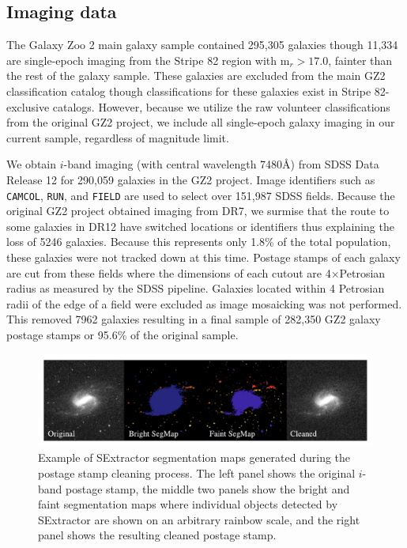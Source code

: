 \subsection{Imaging data}
The Galaxy Zoo 2 main galaxy sample contained 295,305 galaxies though 11,334 are single-epoch imaging from the Stripe 82 region with m$_r > 17.0$, fainter than the rest of the galaxy sample. These galaxies are excluded from the main GZ2 classification catalog though classifications for these galaxies exist in Stripe 82-exclusive catalogs. However, because we utilize the raw volunteer classifications from the original GZ2 project, we include all single-epoch galaxy imaging in our current sample, regardless of magnitude limit.  

We obtain $i$-band imaging (with central wavelength 7480\AA) from SDSS Data Release 12 for 290,059 galaxies in the GZ2 project. Image identifiers such as \texttt{CAMCOL}, \texttt{RUN}, and \texttt{FIELD} are used to select over 151,987 SDSS fields. Because the original GZ2 project obtained imaging from DR7, we surmise that the route to some galaxies in DR12 have switched locations or identifiers thus explaining the loss of 5246 galaxies. Because this represents only 1.8\% of the total population, these galaxies were not tracked down at this time. Postage stamps of each galaxy are cut from these fields where the dimensions of each cutout are 4$\times$Petrosian radius as measured by the SDSS pipeline. Galaxies located within 4 Petrosian radii of the edge of a field were excluded as image mosaicking was not performed. This removed 7962 galaxies resulting in a final sample of 282,350 GZ2 galaxy postage stamps or 95.6\% of the original sample.

\begin{figure}
\includegraphics[width=\textwidth]{Figures/sextractor_example.pdf}
\caption[Example of Source Extractor segmentation maps.]{Example of SExtractor segmentation maps generated during the postage stamp cleaning process. The left panel shows the original $i$-band postage stamp, the middle two panels show the bright and faint segmentation maps where individual objects detected by SExtractor are shown on an arbitrary rainbow scale, and the right panel shows the resulting cleaned postage stamp.}
\label{fig: segmaps}
\end{figure}


